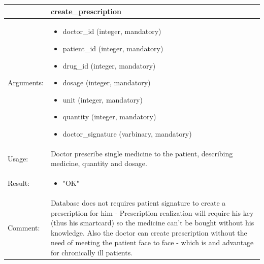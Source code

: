 \begin{table}[h]
    \begin{tabular}{| p{6cm} | p{7.75cm} |}
    \hline
     & create\_prescription \\ \hline
    Arguments: &  \begin{itemize}
    	\item doctor\_id (integer, mandatory)
		\item patient\_id (integer, mandatory)
		\item drug\_id (integer, mandatory)
		\item dosage (integer, mandatory)
		\item unit (integer, mandatory)
		\item quantity (integer, mandatory)
		\item doctor\_signature (varbinary, mandatory)
	\end{itemize}     \\ \hline
    Usage: & Doctor prescribe single medicine to the patient, describing medicine, quantity and dosage. \\ \hline
    Result: & \begin{itemize}
    	\item "OK"
	\end{itemize}     \\ \hline	
		Comment: & Database does not requires patient signature to create a prescription for him - Prescription realization will require his key (thus his smartcard) so the medicine can't be bought without his knowledge. Also the doctor can create prescription without the need of meeting the patient face to face - which is and advantage for chronically ill patients.\\ \hline
    \end{tabular}
\end{table}

